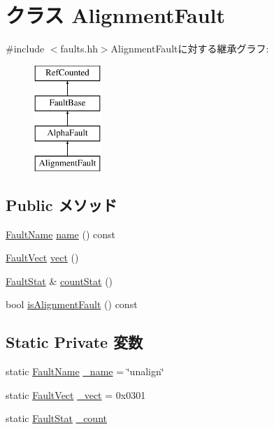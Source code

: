\hypertarget{classAlphaISA_1_1AlignmentFault}{
\section{クラス AlignmentFault}
\label{classAlphaISA_1_1AlignmentFault}
}


{\ttfamily \#include $<$faults.hh$>$}AlignmentFaultに対する継承グラフ:\begin{figure}[H]
\begin{center}
\leavevmode
\includegraphics[height=4cm]{classAlphaISA_1_1AlignmentFault}
\end{center}
\end{figure}
\subsection*{Public メソッド}
\begin{DoxyCompactItemize}
\item 
\hyperlink{sim_2faults_8hh_abb196df64725e5c2568c900cf130d8d7}{FaultName} \hyperlink{classAlphaISA_1_1AlignmentFault_a73adb23259baf912a81683a9790a303f}{name} () const 
\item 
\hyperlink{classm5_1_1params_1_1Addr}{FaultVect} \hyperlink{classAlphaISA_1_1AlignmentFault_ae15c5d7ab0162821b93d668d0b225198}{vect} ()
\item 
\hyperlink{classStats_1_1Scalar}{FaultStat} \& \hyperlink{classAlphaISA_1_1AlignmentFault_a6c79663c761ff57265459f7e3aefaf4c}{countStat} ()
\item 
bool \hyperlink{classAlphaISA_1_1AlignmentFault_ad4aae8bc2dcbe9403effd900aca07d80}{isAlignmentFault} () const 
\end{DoxyCompactItemize}
\subsection*{Static Private 変数}
\begin{DoxyCompactItemize}
\item 
static \hyperlink{sim_2faults_8hh_abb196df64725e5c2568c900cf130d8d7}{FaultName} \hyperlink{classAlphaISA_1_1AlignmentFault_ac79073ffcd2c66a09bcd3bd3ad206019}{\_\-name} = \char`\"{}unalign\char`\"{}
\item 
static \hyperlink{classm5_1_1params_1_1Addr}{FaultVect} \hyperlink{classAlphaISA_1_1AlignmentFault_ad9e5855b9db0b2824cf6c507be4a872e}{\_\-vect} = 0x0301
\item 
static \hyperlink{classStats_1_1Scalar}{FaultStat} \hyperlink{classAlphaISA_1_1AlignmentFault_a4bff925c412f331c5aaf6a39b79619ff}{\_\-count}
\end{DoxyCompactItemize}


